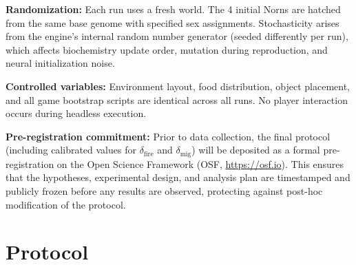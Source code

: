 \documentclass[12pt, a4paper]{article}
\begin{document}
\noindent\textbf{Randomization:} Each run uses a fresh world. The 4 initial Norns are hatched from the same base genome with specified sex assignments. Stochasticity arises from the engine's internal random number generator (seeded differently per run), which affects biochemistry update order, mutation during reproduction, and neural initialization noise.

\noindent\textbf{Controlled variables:} Environment layout, food distribution, object placement, and all game bootstrap scripts are identical across all runs. No player interaction occurs during headless execution.

\noindent\textbf{Pre-registration commitment:} Prior to data collection, the final protocol (including calibrated values for $\delta_{\text{fire}}$ and $\delta_{\text{mig}}$) will be deposited as a formal pre-registration on the Open Science Framework (OSF, \url{https://osf.io}). This ensures that the hypotheses, experimental design, and analysis plan are timestamped and publicly frozen before any results are observed, protecting against post-hoc modification of the protocol.

\section{Protocol}
\label{sec:protocol}
\end{document}
